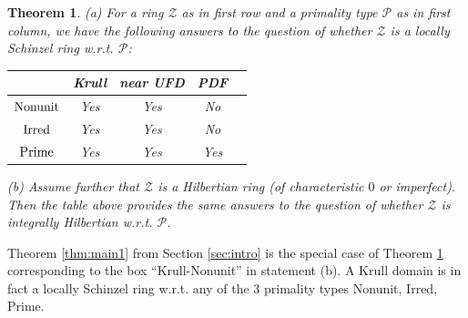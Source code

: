 \documentclass[11pt,a4paper,reqno]{amsart}
\newtheorem{thm}{Theorem}[section]
\theoremstyle{definition}
\begin{document}
\begin{thm} \label{thm-integ-Hilb} 
{\rm (a)} For  a ring ${\mathcal Z}$ as in first row and a primality type ${\mathcal P}$ as in first column, we have the following answers to the question of whether ${\mathcal Z}$ is a locally Schinzel ring \hbox{w.r.t.} ${\mathcal P}$:
\vskip 3mm

\begin{center}
\begin{tabular}{ |c|c|c|c|c| } 
  \hline
   & {\rm Krull} &  {\rm near UFD} & {\rm PDF}\\ 
    \hline
   ${\rm Nonunit}$ & Yes & Yes  & No\\
  \hline
   ${\rm Irred}$&  Yes & Yes  & No\\ 
  \hline
  ${\rm Prime}$&  Yes & Yes & Yes \\
  \hline

\end{tabular}
\end{center}
\vskip 3mm 



\noindent
{\rm (b)} Assume further that ${\mathcal Z}$ is a Hilbertian ring (of characteristic $0$ or imperfect). Then the table above provides the same answers to the question of whether ${\mathcal Z}$ is integrally Hilbertian \hbox{w.r.t.} ${\mathcal P}$.
\end{thm}

Theorem \ref{thm:main1} from Section \ref{sec:intro} is the special case of Theorem \ref{thm-integ-Hilb} corresponding to the box ``Krull-Nonunit'' in statement (b).
A Krull domain is in fact a locally Schinzel ring \hbox{w.r.t.} any of the 3 primality types Nonunit, Irred, Prime.
\end{document}
